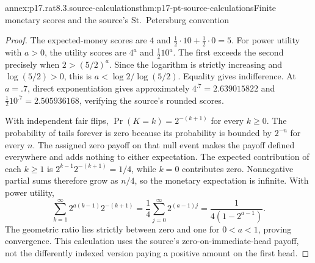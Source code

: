 \begin{annexitem}{annex:p17.rat8.3.source-calculations}{thm:p17-pt-source-calculations}{Finite monetary scores and the source's St.~Petersburg convention}
\begin{proof}
The expected-money scores are \(4\) and
\(\tfrac12\cdot10+\tfrac12\cdot0=5\).
For power utility with \(a>0\), the utility scores are
\(4^a\) and \(\tfrac12 10^a\). The first exceeds the
second precisely when \(2>(5/2)^a\). Since the logarithm
is strictly increasing and \(\log(5/2)>0\), this is
\(a<\log2/\log(5/2)\). Equality gives indifference.
At \(a=.7\), direct exponentiation gives approximately
\(4^{.7}=2.639015822\) and
\(\tfrac12 10^{.7}=2.505936168\), verifying the source's
rounded scores.

With independent fair flips,
\(\Pr(K=k)=2^{-(k+1)}\) for every \(k\geq0\).
The probability of tails forever is zero because its
probability is bounded by \(2^{-n}\) for every \(n\).
The assigned zero payoff on that null event makes the payoff
defined everywhere and adds nothing to either expectation.
The expected contribution of each \(k\geq1\) is
\(2^{k-1}2^{-(k+1)}=1/4\), while \(k=0\) contributes
zero. Nonnegative partial sums therefore grow as \(n/4\),
so the monetary expectation is infinite. With power utility,
\[
 \sum_{k=1}^\infty
       2^{a(k-1)}2^{-(k+1)}
   =\frac14\sum_{j=0}^\infty 2^{(a-1)j}
   =\frac{1}{4(1-2^{a-1})}.
\]
The geometric ratio lies strictly between zero and one for
\(0<a<1\), proving convergence. This calculation uses the
source's zero-on-immediate-head payoff, not the differently
indexed version paying a positive amount on the first head.
\end{proof}
\end{annexitem}

